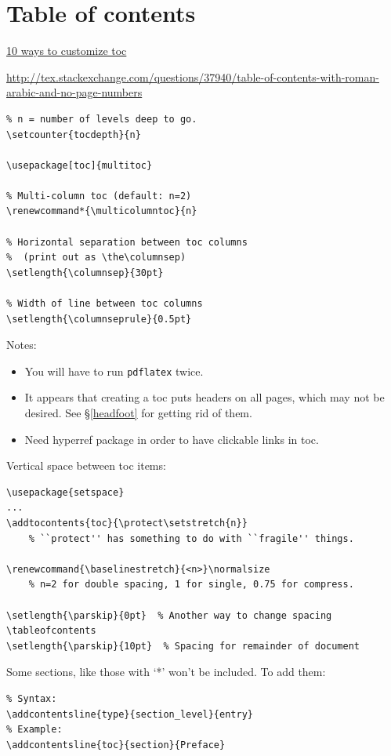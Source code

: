 \documentclass{article}
\renewcommand*{\multicolumntoc}{2}
\begin{document}
\clearpage
\section{Table of contents}\label{contents}%

\href{http://texblog.org/2011/09/09/10-ways-to-customize-tocloflot/}
{10 ways to customize toc}

\url{http://tex.stackexchange.com/questions/37940/table-of-contents-with-roman-arabic-and-no-page-numbers}

\begin{lstlisting}
% n = number of levels deep to go.
\setcounter{tocdepth}{n}

\usepackage[toc]{multitoc}

% Multi-column toc (default: n=2)
\renewcommand*{\multicolumntoc}{n}

% Horizontal separation between toc columns
%  (print out as \the\columnsep)
\setlength{\columnsep}{30pt}

% Width of line between toc columns
\setlength{\columnseprule}{0.5pt}
\end{lstlisting}

Notes:
\begin{itemize}
    \item You will have to run \texttt{pdflatex} twice.
    \item It appears that creating a toc puts headers on all pages, which may
        not be desired. See \S{}\ref{headfoot} for getting rid of them.
    \item Need hyperref package in order to have clickable links in toc.
\end{itemize}

Vertical space between toc items:
\begin{lstlisting}
\usepackage{setspace}
...
\addtocontents{toc}{\protect\setstretch{n}}
    % ``protect'' has something to do with ``fragile'' things.

\renewcommand{\baselinestretch}{<n>}\normalsize
    % n=2 for double spacing, 1 for single, 0.75 for compress.

\setlength{\parskip}{0pt}  % Another way to change spacing
\tableofcontents
\setlength{\parskip}{10pt}  % Spacing for remainder of document
\end{lstlisting}

Some sections, like those with `*' won't be included. To add them:
\begin{lstlisting}
% Syntax:
\addcontentsline{type}{section_level}{entry}
% Example:
\addcontentsline{toc}{section}{Preface}
\end{lstlisting}
\end{document}
